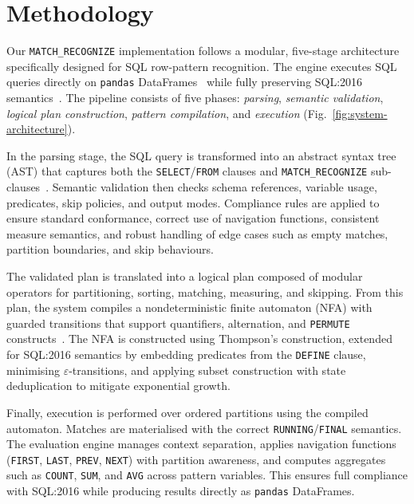 \providecommand{\mr}{\texttt{MATCH\_RECOGNIZE}}
\chapter{Methodology}
\label{chap:methodology}

Our \texttt{MATCH\_RECOGNIZE} implementation follows a modular,
five-stage architecture specifically designed for SQL row-pattern
recognition.  The engine executes SQL queries directly on
\texttt{pandas} DataFrames~\cite{monierashraf2025rowmatch} while
fully preserving SQL:2016 semantics~\cite{iso2016,ISO2021,melton2017sqlrpr}.
The pipeline consists of five phases: \emph{parsing},
\emph{semantic validation}, \emph{logical plan construction},
\emph{pattern compilation}, and \emph{execution}
(Fig.~\ref{fig:system-architecture}).

In the parsing stage, the SQL query is transformed into an abstract
syntax tree (AST) that captures both the \texttt{SELECT}/\texttt{FROM}
clauses and \texttt{MATCH\_RECOGNIZE} sub-clauses~\cite{tarazona2021antlr,parr2013definitive}.
Semantic validation then checks schema references, variable usage,
predicates, skip policies, and output modes.  Compliance rules are
applied to ensure standard conformance, correct use of navigation
functions, consistent measure semantics, and robust handling of edge
cases such as empty matches, partition boundaries, and skip
behaviours.

The validated plan is translated into a logical plan composed of
modular operators for partitioning, sorting, matching, measuring,
and skipping.  From this plan, the system compiles a
nondeterministic finite automaton (NFA) with guarded transitions
that support quantifiers, alternation, and \texttt{PERMUTE}
constructs~\cite{salomaa1996nfa}.  The NFA is constructed using
Thompson's construction, extended for SQL:2016 semantics by
embedding predicates from the \texttt{DEFINE} clause, minimising
$\varepsilon$-transitions, and applying subset construction with
state deduplication to mitigate exponential growth.

Finally, execution is performed over ordered partitions using the
compiled automaton.  Matches are materialised with the correct
\texttt{RUNNING}/\texttt{FINAL} semantics.  The evaluation engine
manages context separation, applies navigation functions
(\texttt{FIRST}, \texttt{LAST}, \texttt{PREV}, \texttt{NEXT}) with
partition awareness, and computes aggregates such as \texttt{COUNT},
\texttt{SUM}, and \texttt{AVG} across pattern variables.  This
ensures full compliance with SQL:2016 while producing results
directly as \texttt{pandas} DataFrames.

